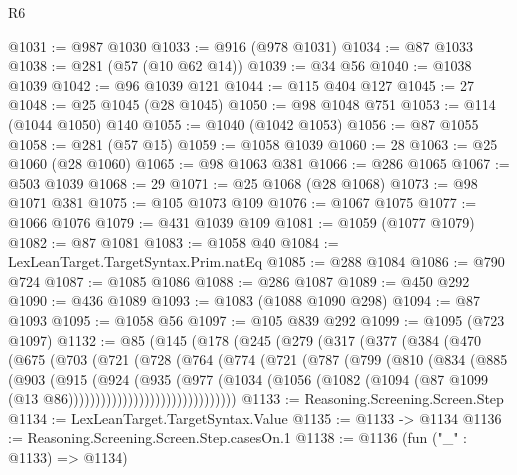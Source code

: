 \begin{lexlean}{R6}
\begin{coremodule}
{{{{{{{{{{{{{{{{{{{{{{{{{{{{{{{{{{{{{{{{{{{{{{{{{{{{{{{{{{{{{@1031 := @987 @1030
@1033 := @916 (@978 @1031)
@1034 := @87 @1033
@1038 := @281 (@57 (@10 @62 @14))
@1039 := @34 @56
@1040 := @1038 @1039
@1042 := @96 @1039 @121
@1044 := @115 @404 @127
@1045 := 27
@1048 := @25 @1045 (@28 @1045)
@1050 := @98 @1048 @751
@1053 := @114 (@1044 @1050) @140
@1055 := @1040 (@1042 @1053)
@1056 := @87 @1055
@1058 := @281 (@57 @15)
@1059 := @1058 @1039
@1060 := 28
@1063 := @25 @1060 (@28 @1060)
@1065 := @98 @1063 @381
@1066 := @286 @1065
@1067 := @503 @1039
@1068 := 29
@1071 := @25 @1068 (@28 @1068)
@1073 := @98 @1071 @381
@1075 := @105 @1073 @109
@1076 := @1067 @1075
@1077 := @1066 @1076
@1079 := @431 @1039 @109
@1081 := @1059 (@1077 @1079)
@1082 := @87 @1081
@1083 := @1058 @40
@1084 := LexLeanTarget.TargetSyntax.Prim.natEq
@1085 := @288 @1084
@1086 := @790 @724
@1087 := @1085 @1086
@1088 := @286 @1087
@1089 := @450 @292
@1090 := @436 @1089
@1093 := @1083 (@1088 @1090 @298)
@1094 := @87 @1093
@1095 := @1058 @56
@1097 := @105 @839 @292
@1099 := @1095 (@723 @1097)
@1132 := @85
    (@145
      (@178
        (@245
          (@279
            (@317
              (@377
                (@384
                  (@470
                    (@675
                      (@703
                        (@721
                          (@728
                            (@764
                              (@774
                                (@721
                                  (@787
                                    (@799
                                      (@810
                                        (@834
                                          (@885
                                            (@903
                                              (@915
                                                (@924
                                                  (@935
                                                    (@977
                                                      (@1034
                                                        (@1056
                                                          (@1082
                                                            (@1094
                                                              (@87
                                                                @1099
                                                                (@13
                                                                  @86)))))))))))))))))))))))))))))))
@1133 := Reasoning.Screening.Screen.Step
@1134 := LexLeanTarget.TargetSyntax.Value
@1135 := @1133 -> @1134
@1136 := Reasoning.Screening.Screen.Step.casesOn.{1}
@1138 := @1136 (fun ("_" : @1133) => @1134)
}}}}}}}}}}}}}}}}}}}}}}}}}}}}}}}}}}}}}}}}}}}}}}}}}}}}}}}}}}}}}
\end{coremodule}
\end{lexlean}
